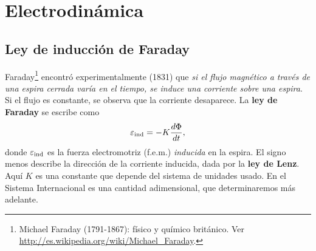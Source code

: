 \chapter{Electrodinámica}

\section{Ley de inducción de Faraday}

Faraday\footnote{Michael Faraday (1791-1867): físico y químico británico. Ver \url{http://es.wikipedia.org/wiki/Michael_Faraday}.} encontró experimentalmente (1831) que \textit{si el flujo magnético a través de una espira cerrada varía en el tiempo, se induce una corriente sobre una espira}. Si el flujo es constante, se observa que la corriente desaparece. La \textbf{ley de Faraday} se escribe como
\begin{equation}\label{faraday}
\varepsilon_{\rm ind}=-K\frac{d\Phi}{dt},
\end{equation}
donde $\varepsilon_{\rm ind}$ es la fuerza electromotriz (f.e.m.) \textit{inducida} en la espira. El signo menos describe la dirección de la corriente inducida, dada por la \textbf{ley de Lenz}. Aquí $K$ es una constante que depende del sistema de unidades usado. En el Sistema Internacional es una cantidad adimensional, que determinaremos más adelante.

